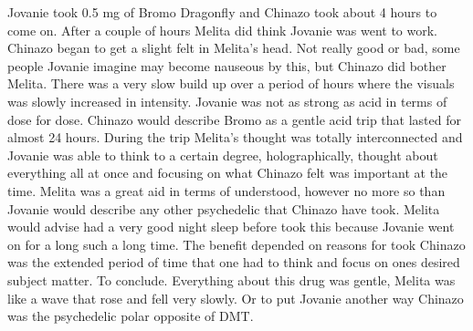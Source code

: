 \documentclass[12pt]{book}
\begin{document}
Jovanie took 0.5 mg of Bromo Dragonfly and Chinazo took about 4 hours to come on. After a couple of hours Melita did think Jovanie was went to work. Chinazo began to get a slight felt in Melita's head. Not really good or bad, some people Jovanie imagine may become nauseous by this, but Chinazo did bother Melita. There was a very slow build up over a period of hours where the visuals was slowly increased in intensity. Jovanie was not as strong as acid in terms of dose for dose. Chinazo would describe Bromo as a gentle acid trip that lasted for almost 24 hours. During the trip Melita's thought was totally interconnected and Jovanie was able to think to a certain degree, holographically, thought about everything all at once and focusing on what Chinazo felt was important at the time. Melita was a great aid in terms of understood, however no more so than Jovanie would describe any other psychedelic that Chinazo have took. Melita would advise had a very good night sleep before took this because Jovanie went on for a long such a long time. The benefit depended on reasons for took Chinazo was the extended period of time that one had to think and focus on ones desired subject matter. To conclude. Everything about this drug was gentle, Melita was like a wave that rose and fell very slowly. Or to put Jovanie another way Chinazo was the psychedelic polar opposite of DMT.
\end{document}
